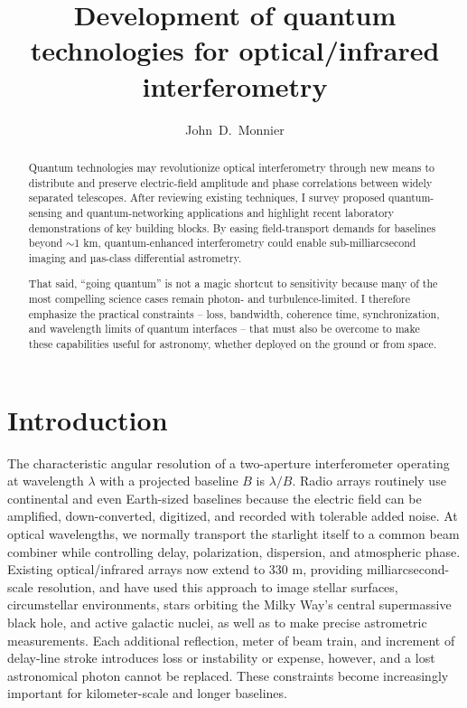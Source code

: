 \documentclass[]{spie}
\title{Development of quantum technologies for optical/infrared interferometry}
\author[a]{John~D.~Monnier}
\affil[a]{Department of Astronomy, University of Michigan, Ann Arbor, Michigan 48109, USA}
\begin{document}
\maketitle

\begin{abstract}
Quantum technologies may revolutionize optical interferometry through new means to distribute and preserve electric-field amplitude and phase correlations between widely separated telescopes. After reviewing existing techniques, I survey proposed quantum-sensing and quantum-networking applications and highlight recent laboratory demonstrations of key building blocks. By easing field-transport demands for baselines beyond $\sim$1 km, quantum-enhanced interferometry could enable sub-milliarcsecond imaging and µas-class differential astrometry.

That said, ``going quantum'' is not a magic shortcut to sensitivity because many of the most compelling science cases remain photon- and turbulence-limited. I therefore emphasize the practical constraints -- loss, bandwidth, coherence time, synchronization, and wavelength limits of quantum interfaces -- that must also be overcome to make these capabilities useful for astronomy, whether deployed on the ground or from space.
\end{abstract}


\section{Introduction}
\label{sec:introduction}

The characteristic angular resolution of a two-aperture interferometer operating at wavelength $\lambda$ with a projected baseline $B$ is $\lambda/B$. Radio arrays routinely use continental and even Earth-sized baselines because the electric field can be amplified, down-converted, digitized, and recorded with tolerable added noise. At optical wavelengths, we normally transport the starlight itself to a common beam combiner while controlling delay, polarization, dispersion, and atmospheric phase. Existing optical/infrared arrays now extend to 330 m, providing milliarcsecond-scale resolution, and have used this approach to image stellar surfaces, circumstellar environments, stars orbiting the Milky Way's central supermassive black hole, and active galactic nuclei, as well as to make precise astrometric measurements.\cite{Monnier2003,Eisenhauer2023} Each additional reflection, meter of beam train, and increment of delay-line stroke introduces loss or instability or expense, however, and a lost astronomical photon cannot be replaced. These constraints become increasingly important for kilometer-scale and longer baselines.
\end{document}

